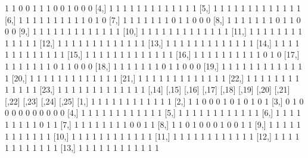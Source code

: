 \documentclass[a4paper]{article}
\begin{document}
\begin{Schunk}
\begin{Soutput}
 [3,]    1    1    0    0    1    1    1    0    0     1     0     0     0
 [4,]    1    1    1    1    1    1    1    1    1     1     1     1     1
 [5,]    1    1    1    1    1    1    1    1    1     1     1     1     1
 [6,]    1    1    1    1    1    1    1    1    1     1     0     1     0
 [7,]    1    1    1    1    1    1    1    0    1     1     0     0     0
 [8,]    1    1    1    1    1    1    1    0    1     1     0     0     0
 [9,]    1    1    1    1    1    1    1    1    1     1     1     1     1
[10,]    1    1    1    1    1    1    1    1    1     1     1     1     1
[11,]    1    1    1    1    1    1    1    1    1     1     1     1     1
[12,]    1    1    1    1    1    1    1    1    1     1     1     1     1
[13,]    1    1    1    1    1    1    1    1    1     1     1     1     1
[14,]    1    1    1    1    1    1    1    1    1     1     1     1     1
[15,]    1    1    1    1    1    1    1    1    1     1     1     1     1
[16,]    1    1    1    1    1    1    1    1    1     1     0     1     0
[17,]    1    1    1    1    1    1    1    0    1     1     0     0     0
[18,]    1    1    1    1    1    1    1    0    1     1     0     0     0
[19,]    1    1    1    1    1    1    1    1    1     1     1     1     1
[20,]    1    1    1    1    1    1    1    1    1     1     1     1     1
[21,]    1    1    1    1    1    1    1    1    1     1     1     1     1
[22,]    1    1    1    1    1    1    1    1    1     1     1     1     1
[23,]    1    1    1    1    1    1    1    1    1     1     1     1     1
      [,14] [,15] [,16] [,17] [,18] [,19] [,20] [,21] [,22] [,23] [,24] [,25]
 [1,]     1     1     1     1     1     1     1     1     1     1     1     1
 [2,]     1     1     0     0     0     1     0     1     0     1     0     1
 [3,]     0     1     0     0     0     0     0     0     0     0     0     0
 [4,]     1     1     1     1     1     1     1     1     1     1     1     1
 [5,]     1     1     1     1     1     1     1     1     1     1     1     1
 [6,]     1     1     1     1     1     1     1     1     1     0     1     1
 [7,]     1     1     1     1     1     1     1     1     0     0     1     1
 [8,]     1     1     0     1     0     0     0     1     0     0     1     1
 [9,]     1     1     1     1     1     1     1     1     1     1     1     1
[10,]     1     1     1     1     1     1     1     1     1     1     1     1
[11,]     1     1     1     1     1     1     1     1     1     1     1     1
[12,]     1     1     1     1     1     1     1     1     1     1     1     1
[13,]     1     1     1     1     1     1     1     1     1     1     1     1

\end{Soutput}
\end{Schunk}
\end{document}
